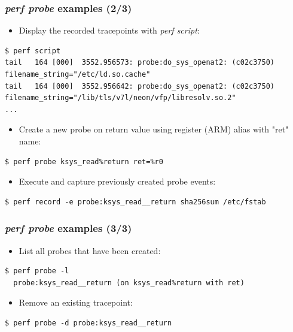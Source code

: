 \begin{frame}[fragile]
  \frametitle{{\em perf probe} examples (2/3)}

  \begin{itemize}
    \item Display the recorded tracepoints with {\em perf script}:
  \end{itemize}
  \begin{block}{}
    \begin{verbatim}
$ perf script
tail   164 [000]  3552.956573: probe:do_sys_openat2: (c02c3750) filename_string="/etc/ld.so.cache"
tail   164 [000]  3552.956642: probe:do_sys_openat2: (c02c3750) filename_string="/lib/tls/v7l/neon/vfp/libresolv.so.2"
...
    \end{verbatim}
  \end{block}
  \begin{itemize}
    \item Create a new probe on  return value using register
           (ARM) alias with "ret" name:
  \end{itemize}
  \begin{block}{}
    \begin{verbatim}
$ perf probe ksys_read%return ret=%r0
    \end{verbatim}
  \end{block}
  \begin{itemize}
    \item Execute  and capture previously created probe events:
  \end{itemize}
  \begin{block}{}
    \begin{verbatim}
$ perf record -e probe:ksys_read__return sha256sum /etc/fstab
    \end{verbatim}
  \end{block}
\end{frame}

\begin{frame}[fragile]
  \frametitle{{\em perf probe} examples (3/3)}

  \begin{itemize}
    \item List all probes that have been created:
  \end{itemize}
  \begin{block}{}
    \begin{verbatim}
$ perf probe -l
  probe:ksys_read__return (on ksys_read%return with ret)
    \end{verbatim}
  \end{block}
  \begin{itemize}
    \item Remove an existing tracepoint:
  \end{itemize}
  \begin{block}{}
    \begin{verbatim}
$ perf probe -d probe:ksys_read__return
    \end{verbatim}
  \end{block}
\end{frame}

